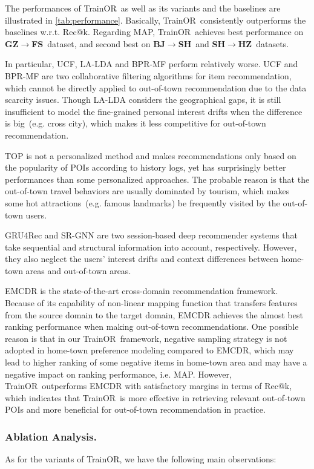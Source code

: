 \documentclass[letterpaper]{article} %
\newcommand{\ourmodel}{{\sc TrainOR}}
\newcommand{\bjsh}{{\bf BJ\ensuremath{\rightarrow}SH}}
\newcommand{\shhz}{{\bf SH\ensuremath{\rightarrow}HZ}}
\newcommand{\gzfs}{{\bf GZ\ensuremath{\rightarrow}FS}}
\begin{document}
The performances of \ourmodel ~as well as its variants and the baselines are illustrated in \cref{tab:performance}.
Basically, \ourmodel~consistently outperforms the baselines w.r.t. Rec@k.
Regarding MAP, \ourmodel~achieves best performance on \gzfs ~dataset, and second best on \bjsh ~and \shhz ~datasets.

In particular, UCF, LA-LDA and BPR-MF perform relatively worse.
UCF and BPR-MF are two collaborative filtering algorithms for item recommendation,
which cannot be directly applied to out-of-town recommendation due to the data scarcity issues.
Though LA-LDA considers the geographical gaps, it is still insufficient to model the fine-grained personal interest drifts when the difference is big~(e.g. cross city), which makes it less competitive for out-of-town recommendation. %

TOP is not a personalized method and makes recommendations only based on the popularity of POIs according to history logs,
yet has surprisingly better performances than some personalized approaches.
The probable reason is that the out-of-town travel behaviors are usually dominated by tourism, which makes some hot attractions~(e.g. famous landmarks) be frequently visited by the out-of-town users.

GRU4Rec and SR-GNN are two session-based deep recommender systems that take sequential and structural information into account, respectively.
However, they also neglect the users' interest drifts and context differences between home-town areas and out-of-town areas.

EMCDR is the state-of-the-art cross-domain recommendation framework.
Because of its capability of non-linear mapping function that transfers features from the source domain to the target domain, EMCDR achieves the almost best ranking performance when making out-of-town recommendations.
One possible reason is that in our \ourmodel~framework, negative sampling strategy is not adopted in home-town preference modeling compared to EMCDR,
which may lead to higher ranking of some negative items in home-town area and may have a negative impact on ranking performance, i.e. MAP.
However, \ourmodel~outperforms EMCDR with satisfactory margins in terms of Rec@k, which indicates that \ourmodel~is more effective in retrieving relevant out-of-town POIs and more beneficial for out-of-town recommendation in practice.


\subsubsection{Ablation Analysis.}
As for the variants of \ourmodel, we have the following main observations:
\end{document}
